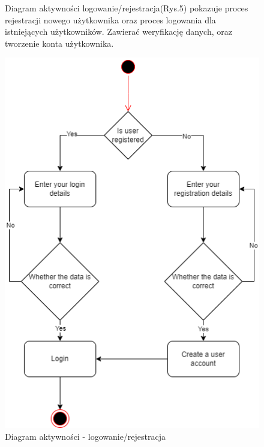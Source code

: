 \documentclass[]{article}
\begin{document}
\begin{figure}[ht]
	\begin{minipage}{\textwidth}
		Diagram aktywności logowanie/rejestracja(Rys.5) pokazuje proces rejestracji nowego użytkownika oraz proces logowania dla istniejących użytkowników. Zawierać weryfikację danych, oraz tworzenie konta użytkownika.
	\end{minipage}
	\vspace{15pt}
	
	\centering
	\includegraphics[scale=0.50]{log_rej.png}
	\caption{Diagram aktywności - logowanie/rejestracja}
\end{figure}
\end{document}
